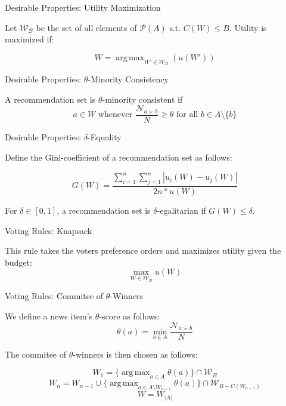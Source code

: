 \documentclass{beamer}
\DeclareMathOperator*{\argmax}{arg\,max}
\begin{document}
\begin{frame}{Desirable Properties: Utility Maximization}

Let $\mathcal {W_B}$ be the set of all elements of $\mathcal{P}(A)$ s.t. $C(W)\leq B$. Utility is maximized if:

\[
W=\argmax_{W'\in \mathcal{W}_B}(u(W')) 
\]

	
\end{frame}

\begin{frame}{Desirable Properties: $\theta$-Minority Consistency}
	
A recommendation set is $\theta$-minority consistent if \[a\in W\text{ whenever }\frac {\mathcal{N}_{a\succ b}}{N}\geq \theta \text{ for all } b\in A\setminus \{b\} \]
	
\end{frame}

\begin{frame}{Desirable Properties: $\delta$-Equality}
	
	Define the Gini-coefficient of a recommendation set as follows: 
	
	\[G(W)=\frac{\displaystyle{\sum_{i=1}^n \sum_{j=1}^n \left| u_i(W) - u_j(W) \right|}}{\displaystyle{2n* u(W)}}\]
	
	For $\delta\in [0,1]$, a recommendation set is $\delta$-egalitarian if $G(W)\leq \delta$. 
	
\end{frame}

\begin{frame}{Voting Rules: Knapsack}

This rule takes the voters preference orders and maximizes utility given the budget:
\[
\max_{W\in\mathcal{ W_B}} u(W)
	\]
	
\end{frame}

\begin{frame}{Voting Rules: Commitee of $\theta$-Winners}
	
We define a news item's $\theta$-score as follows: \[\theta(a)=\min_{b\in A} \frac{\mathcal{N}_{a\succ b}}{N}\]

The commitee of $\theta$-winners is then chosen as follows:

\[W_1=\{\argmax_{a\in A}\theta(a)\}\cap \mathcal{W}_B\]
\[W_n=W_{n-1}\cup \{\argmax_{a\in A\setminus W_{n-1}}\theta (a)\}\cap \mathcal{W}_{B-C(W_{n-1})}\]
\[W=W_{|A|}\]

\end{frame}

%
%
\end{document}
